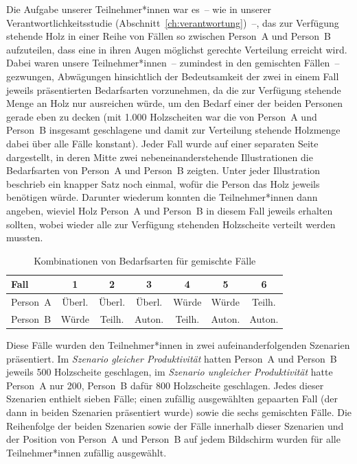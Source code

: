\documentclass[justified,nobib,nohyper,symmetric,twoside]{tufte-book}
\begin{document}
Die Aufgabe unserer Teilnehmer*innen war es~-- wie in unserer Verantwortlichkeitsstudie (Abschnitt~\ref{ch:verantwortung})~--, das zur Verfügung stehende Holz in einer Reihe von Fällen so zwischen Person~A und Person~B aufzuteilen, dass eine in ihren Augen möglichst gerechte Verteilung erreicht wird.
Dabei waren unsere Teilnehmer*innen~-- zumindest in den gemischten Fällen~-- gezwungen, Abwägungen hinsichtlich der Bedeutsamkeit der zwei in einem Fall jeweils präsentierten Bedarfsarten vorzunehmen, da die zur Verfügung stehende Menge an Holz nur ausreichen würde, um den Bedarf einer der beiden Personen gerade eben zu decken (mit 1.000 Holzscheiten war die von Person~A und Person~B insgesamt geschlagene und damit zur Verteilung stehende Holzmenge dabei über alle Fälle konstant).
Jeder Fall wurde auf einer separaten Seite dargestellt, in deren Mitte zwei nebeneinanderstehende Illustrationen die Bedarfsarten von Person~A und Person~B zeigten.
Unter jeder Illustration beschrieb ein knapper Satz noch einmal, wofür die Person das Holz jeweils benötigen würde.
Darunter wiederum konnten die Teilnehmer*innen dann angeben, wieviel Holz Person~A und Person~B in diesem Fall jeweils erhalten sollten, wobei wieder alle zur Verfügung stehenden Holzscheite verteilt werden mussten.

\begin{table}[t]
   \caption{Kombinationen von Bedarfsarten für gemischte Fälle}\label{tab:kombinationen}
   \begin{center}
   \begin{tabular}{lcccccc}
   \hline
   Fall       & 1        & 2        & 3        & 4        & 5        & 6        \\
   \hline\hline
   Person~A   & Überl.   & Überl.   & Überl.   & Würde    & Würde    & Teilh.   \\
   Person~B   & Würde    & Teilh.   & Auton.   & Teilh.   & Auton.   & Auton.   \\
   \hline
   \end{tabular}
   \end{center}
\end{table}

Diese Fälle wurden den Teilnehmer*innen in zwei aufeinanderfolgenden Szenarien präsentiert.
Im \textit{Szenario gleicher Produktivität} hatten Person~A und Person~B jeweils 500 Holzscheite geschlagen, im \textit{Szenario ungleicher Produktivität} hatte Person~A nur 200, Person~B dafür 800 Holzscheite geschlagen.
Jedes dieser Szenarien enthielt sieben Fälle; einen zufällig ausgewählten gepaarten Fall (der dann in beiden Szenarien präsentiert wurde) sowie die sechs gemischten Fälle.
Die Reihenfolge der beiden Szenarien sowie der Fälle innerhalb dieser Szenarien und der Position von Person~A und Person~B auf jedem Bildschirm wurden für alle Teilnehmer*innen zufällig ausgewählt.
\end{document}
